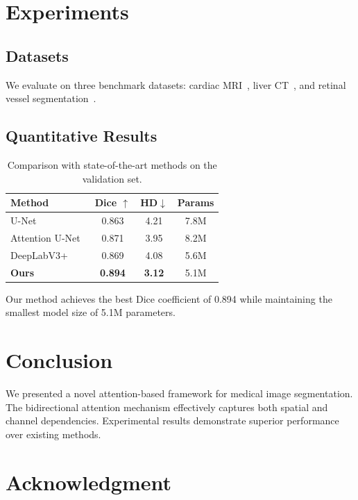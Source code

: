 \documentclass[journal,12pt]{IEEEtran}
\begin{document}
\section{Experiments}
\label{sec:exp}

\subsection{Datasets}
\label{ssec:data}

We evaluate on three benchmark datasets: cardiac MRI~\cite{cardiac_mri},
liver CT~\cite{liver_ct}, and retinal vessel segmentation~\cite{retinal}.

\subsection{Quantitative Results}
\label{ssec:quant}

\begin{table}[t]
\centering
\caption{Comparison with state-of-the-art methods on the validation set.}
\label{tab:compare}
\begin{tabular}{lccc}
  \toprule
  Method & Dice $\uparrow$ & HD$\downarrow$ & Params \\
  \midrule
  U-Net~\cite{ronneberger2015unet} & 0.863 & 4.21 & 7.8M \\
  Attention U-Net~\cite{oktay2018attention} & 0.871 & 3.95 & 8.2M \\
  DeepLabV3+~\cite{deeplabv3plus} & 0.869 & 4.08 & 5.6M \\
  \textbf{Ours} & \textbf{0.894} & \textbf{3.12} & 5.1M \\
  \bottomrule
\end{tabular}
\end{table}

Our method achieves the best Dice coefficient of 0.894 while maintaining
the smallest model size of 5.1M parameters.

\section{Conclusion}
\label{sec:concl}

We presented a novel attention-based framework for medical image segmentation.
The bidirectional attention mechanism effectively captures both spatial and
channel dependencies. Experimental results demonstrate superior performance
over existing methods.

\section*{Acknowledgment}
\end{document}
